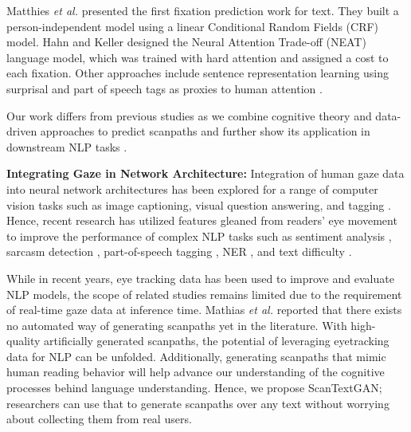 Matthies \textit{et al.} \cite{matthies-sogaard-2013-blinkers} presented the first fixation prediction work for text. They built a person-independent model using a linear Conditional Random Fields (CRF) model. %
Hahn and Keller \cite{hahn-keller-2016-modeling} designed the Neural Attention Trade-off (NEAT) language model, which was trained with hard attention and assigned a cost to each fixation. Other approaches include sentence representation learning using surprisal and part of speech tags as proxies to human attention \cite{10.5555/3171837.3171864}.%

Our work differs from previous studies as we combine cognitive theory and data-driven approaches to predict scanpaths and further show its application in downstream NLP tasks \cite{hollenstein-etal-2021-multilingual,hollenstein-etal-2021-cmcl}.




\textbf{Integrating Gaze in Network Architecture:} Integration of human gaze data into neural network architectures has been explored for a range of computer vision tasks such as image captioning, visual question answering, and tagging \cite{karessli2017gaze,yu2017supervising,he2019human,boyd2022human}. %
Hence, recent research has utilized features gleaned from readers' eye movement to improve the performance of complex NLP tasks such as sentiment analysis \cite{long-etal-2017-cognition, mishra-etal-2016-leveraging}, sarcasm detection \cite{mishra-etal-2016-harnessing}, part-of-speech tagging \cite{barrett-etal-2016-cross}, NER \cite{hollenstein-zhang-2019-entity}, and text difficulty \cite{ScanPathApp1}.

While in recent years, eye tracking data has been used to improve and evaluate NLP models, the scope of related studies remains limited due to the %
requirement of real-time gaze data at inference time. Mathias \textit{et al.} \cite{ijcaiSurveyGapIdentified} reported that there exists no automated way of generating scanpaths yet in the literature. With high-quality artificially generated scanpaths, the potential of leveraging eyetracking data for NLP can be unfolded. Additionally, generating scanpaths that mimic human reading behavior will help advance our understanding of the cognitive processes behind language understanding. Hence, we propose ScanTextGAN; researchers can use that to generate scanpaths over any text without worrying about collecting them from real users. 

